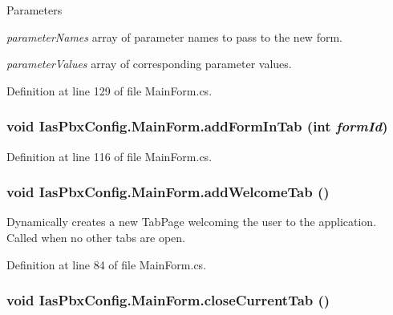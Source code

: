 \begin{DoxyParams}{Parameters}
\item[{\em parameterNames}]array of parameter names to pass to the new form. \item[{\em parameterValues}]array of corresponding parameter values. \end{DoxyParams}


Definition at line 129 of file MainForm.cs.\hypertarget{class_ias_pbx_config_1_1_main_form_a5edd3bec577d04401d92562d507c8380}{
\subsubsection[{addFormInTab}]{\setlength{\rightskip}{0pt plus 5cm}void IasPbxConfig.MainForm.addFormInTab (int {\em formId})}}
\label{class_ias_pbx_config_1_1_main_form_a5edd3bec577d04401d92562d507c8380}


Definition at line 116 of file MainForm.cs.\hypertarget{class_ias_pbx_config_1_1_main_form_ae464d50243315dc81ede782996ae3258}{
\subsubsection[{addWelcomeTab}]{\setlength{\rightskip}{0pt plus 5cm}void IasPbxConfig.MainForm.addWelcomeTab ()}}
\label{class_ias_pbx_config_1_1_main_form_ae464d50243315dc81ede782996ae3258}


Dynamically creates a new TabPage welcoming the user to the application. Called when no other tabs are open. 

Definition at line 84 of file MainForm.cs.\hypertarget{class_ias_pbx_config_1_1_main_form_a9e37d37f15735de72d7242f27216865b}{
\subsubsection[{closeCurrentTab}]{\setlength{\rightskip}{0pt plus 5cm}void IasPbxConfig.MainForm.closeCurrentTab ()}}
\label{class_ias_pbx_config_1_1_main_form_a9e37d37f15735de72d7242f27216865b}


